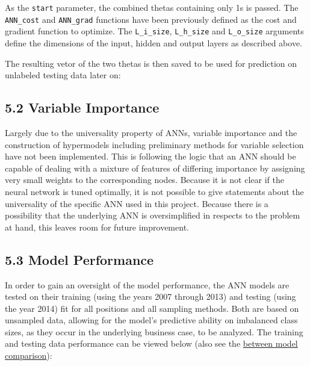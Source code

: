 \documentclass[]{article}
\newenvironment{Shaded}{\begin{snugshade}}{\end{snugshade}}
\newcommand{\NormalTok}[1]{#1}
\newcommand{\OperatorTok}[1]{\textcolor[rgb]{0.81,0.36,0.00}{\textbf{#1}}}
\newcommand{\StringTok}[1]{\textcolor[rgb]{0.31,0.60,0.02}{#1}}
\begin{document}
As the \texttt{start} parameter, the combined thetas containing only 1s
is passed. The \texttt{ANN\_cost} and \texttt{ANN\_grad} functions have
been previously defined as the cost and gradient function to optimize.
The \texttt{L\_i\_size}, \texttt{L\_h\_size} and \texttt{L\_o\_size}
arguments define the dimensions of the input, hidden and output layers
as described above.

The resulting vetor of the two thetas is then saved to be used for
prediction on unlabeled testing data later on:

\begin{Shaded}
\end{Shaded}

\hypertarget{variable-importance}{%
\subsection{5.2 Variable Importance}\label{variable-importance}}

Largely due to the universality property of ANNs, variable importance
and the construction of hypermodels including preliminary methods for
variable selection have not been implemented. This is following the
logic that an ANN should be capable of dealing with a mixture of
features of differing importance by assigning very small weights to the
corresponding nodes. Because it is not clear if the neural network is
tuned optimally, it is not possible to give statements about the
universality of the specific ANN used in this project. Because there is
a possibility that the underlying ANN is oversimplified in respects to
the problem at hand, this leaves room for future improvement.

\hypertarget{model-performance}{%
\subsection{5.3 Model Performance}\label{model-performance}}

In order to gain an oversight of the model performance, the ANN models
are tested on their training (using the years 2007 through 2013) and
testing (using the year 2014) fit for all positions and all sampling
methods. Both are based on unsampled data, allowing for the model's
predictive ability on imbalanced class sizes, as they occur in the
underlying business case, to be analyzed. The training and testing data
performance can be viewed below (also see the
\href{https://github.com/NicSchuler/DSF_NFLDraftPrediction/blob/master/Data/READMEs/RM_PerformanceMeasurement.pdf}{between
model comparison}):
\end{document}

